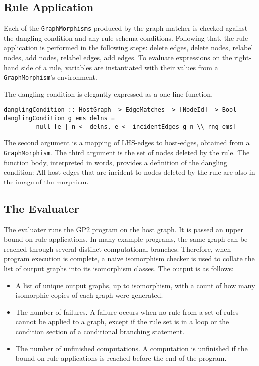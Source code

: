 \subsection{Rule Application}
Each of the \texttt{GraphMorphisms} produced by the graph matcher is checked against the dangling condition and any rule schema conditions. Following that, the rule application is performed in the following steps: delete edges, delete nodes, relabel nodes, add nodes, relabel edges, add edges. To evaluate expressions on the right-hand side of a rule, variables are instantiated with their values from a \texttt{GraphMorphism}'s environment. 

The dangling condition is elegantly expressed as a one line function.
\begin{verbatim}
danglingCondition :: HostGraph -> EdgeMatches -> [NodeId] -> Bool
danglingCondition g ems delns = 
         null [e | n <- delns, e <- incidentEdges g n \\ rng ems]
\end{verbatim}

The second argument is a mapping of LHS-edges to host-edges, obtained from a \texttt{GraphMorphism}. The third argument is the set of nodes deleted by the rule. The function body, interpreted in words, provides a definition of the dangling condition: All host edges that are incident to nodes deleted by the rule are also in the image of the morphism. 

\subsection{The Evaluater}\label{sec:eval}
The evaluater runs the GP2 program on the host graph. It is passed an upper bound on rule applications. In many example programs, the same graph can be reached through several distinct computational branches. Therefore, when program execution is complete, a naive isomorphism checker is used to collate the list of output graphs into its isomorphism classes. The output is as follows:

\begin{itemize}
\item A list of unique output graphs, up to isomorphism, with a count of how many isomorphic copies of each graph were generated.
\item The number of failures. A failure occurs when no rule from a set of rules cannot be applied to a graph, except if the rule set is in a loop or the condition section of a conditional branching statement.
\item The number of unfinished computations. A computation is unfinished if the bound on rule applications is reached before the end of the program.
\end{itemize}

